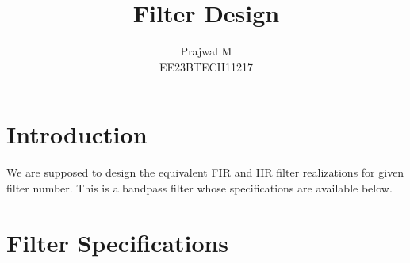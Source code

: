 \documentclass{article}
\begin{document}
\title{ \textbf{Filter Design}}

\author{Prajwal M\\EE23BTECH11217}
\date{}

\maketitle
\section{Introduction}
We are supposed to design the equivalent FIR and IIR filter realizations for given filter number.  
This is a bandpass filter whose specifications are available below.

\section{Filter Specifications}
\end{document}
